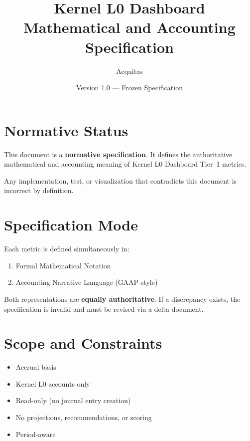 \documentclass[11pt]{article}
\title{Kernel L0 Dashboard \\ Mathematical and Accounting Specification}
\author{Aequitas}
\date{Version 1.0 --- Frozen Specification}
\begin{document}
\maketitle

\section*{Normative Status}
This document is a \textbf{normative specification}.
It defines the authoritative mathematical and accounting meaning
of Kernel L0 Dashboard Tier~1 metrics.

Any implementation, test, or visualization that contradicts this
document is incorrect by definition.

\section*{Specification Mode}
Each metric is defined simultaneously in:
\begin{enumerate}
  \item Formal Mathematical Notation
  \item Accounting Narrative Language (GAAP-style)
\end{enumerate}

Both representations are \textbf{equally authoritative}.
If a discrepancy exists, the specification is invalid and must be
revised via a delta document.

\section*{Scope and Constraints}
\begin{itemize}
  \item Accrual basis
  \item Kernel L0 accounts only
  \item Read-only (no journal entry creation)
  \item No projections, recommendations, or scoring
  \item Period-aware
\end{itemize}


\end{document}
